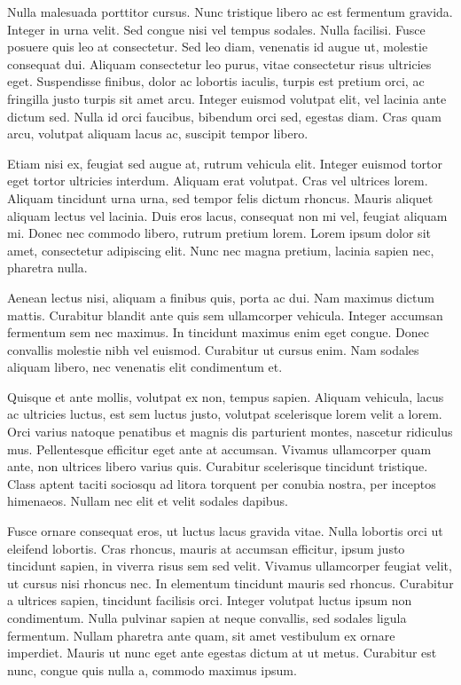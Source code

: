 \documentclass[
  a5paper,
  smalldemyvopaper,10pt,twoside,onecolumn,openright,extrafontsizes,hidelinks]{memoir}
\begin{document}
Nulla malesuada porttitor cursus. Nunc tristique libero ac est fermentum
gravida. Integer in urna velit. Sed congue nisi vel tempus sodales.
Nulla facilisi. Fusce posuere quis leo at consectetur. Sed leo diam,
venenatis id augue ut, molestie consequat dui. Aliquam consectetur leo
purus, vitae consectetur risus ultricies eget. Suspendisse finibus,
dolor ac lobortis iaculis, turpis est pretium orci, ac fringilla justo
turpis sit amet arcu. Integer euismod volutpat elit, vel lacinia ante
dictum sed. Nulla id orci faucibus, bibendum orci sed, egestas diam.
Cras quam arcu, volutpat aliquam lacus ac, suscipit tempor libero.

Etiam nisi ex, feugiat sed augue at, rutrum vehicula elit. Integer
euismod tortor eget tortor ultricies interdum. Aliquam erat volutpat.
Cras vel ultrices lorem. Aliquam tincidunt urna urna, sed tempor felis
dictum rhoncus. Mauris aliquet aliquam lectus vel lacinia. Duis eros
lacus, consequat non mi vel, feugiat aliquam mi. Donec nec commodo
libero, rutrum pretium lorem. Lorem ipsum dolor sit amet, consectetur
adipiscing elit. Nunc nec magna pretium, lacinia sapien nec, pharetra
nulla.

Aenean lectus nisi, aliquam a finibus quis, porta ac dui. Nam maximus
dictum mattis. Curabitur blandit ante quis sem ullamcorper vehicula.
Integer accumsan fermentum sem nec maximus. In tincidunt maximus enim
eget congue. Donec convallis molestie nibh vel euismod. Curabitur ut
cursus enim. Nam sodales aliquam libero, nec venenatis elit condimentum
et.

Quisque et ante mollis, volutpat ex non, tempus sapien. Aliquam
vehicula, lacus ac ultricies luctus, est sem luctus justo, volutpat
scelerisque lorem velit a lorem. Orci varius natoque penatibus et magnis
dis parturient montes, nascetur ridiculus mus. Pellentesque efficitur
eget ante at accumsan. Vivamus ullamcorper quam ante, non ultrices
libero varius quis. Curabitur scelerisque tincidunt tristique. Class
aptent taciti sociosqu ad litora torquent per conubia nostra, per
inceptos himenaeos. Nullam nec elit et velit sodales dapibus.

Fusce ornare consequat eros, ut luctus lacus gravida vitae. Nulla
lobortis orci ut eleifend lobortis. Cras rhoncus, mauris at accumsan
efficitur, ipsum justo tincidunt sapien, in viverra risus sem sed velit.
Vivamus ullamcorper feugiat velit, ut cursus nisi rhoncus nec. In
elementum tincidunt mauris sed rhoncus. Curabitur a ultrices sapien,
tincidunt facilisis orci. Integer volutpat luctus ipsum non condimentum.
Nulla pulvinar sapien at neque convallis, sed sodales ligula fermentum.
Nullam pharetra ante quam, sit amet vestibulum ex ornare imperdiet.
Mauris ut nunc eget ante egestas dictum at ut metus. Curabitur est nunc,
congue quis nulla a, commodo maximus ipsum.
\end{document}
